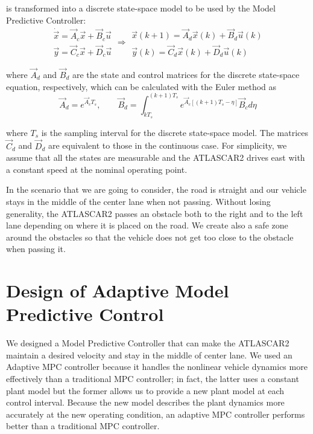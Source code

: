 is transformed into a discrete state-space model to be used by the Model Predictive Controller:
\begin{equation}
\label{eqn:dynamics_ss_obstacle_avoidance_dis}
\begin{array}{ll}
\dot{\vec{x}} =\vec{A}_c \vec{x}+ \vec{B}_c \vec{u}\\
\vec{y} =\vec{C}_c \vec{x} + \vec{D}_c \vec{u}
\end{array}
\Longrightarrow
\begin{array}{rr}
{\vec{x}}(k+1) =\vec{A}_d \vec{x}(k)+ \vec{B}_d \vec{u}(k)\\
\vec{y}(k) =\vec{C}_d \vec{x}(k) + \vec{D}_d \vec{u}(k)
\end{array}
\end{equation}

where $\vec{A}_d$ and $\vec{B}_d$ are the state and control matrices for the discrete state-space equation, respectively, which can be calculated with the Euler method as
\begin{equation}
\vec{A}_d = e^{\vec{A}_cT_s},\qquad \vec{B}_d = \int_{kT_s}^{(k+1)T_s} e^{\vec{A}_c[(k+1)T_s-\eta]}\vec{B}_c d\eta
\end{equation}

where $T_s$ is the sampling interval for the discrete state-space model. The matrices $\vec{C}_d$ and $\vec{D}_d$ are equivalent to those in the continuous case. For simplicity, we assume that all the states are measurable and the ATLASCAR2 drives east with a constant speed at the nominal operating point. 

In the scenario that we are going to consider, the road is straight and our vehicle stays in the middle of the center lane when not passing. Without losing generality, the ATLASCAR2 passes an obstacle both to the right and to the left lane depending on where it is placed on the road. We create also a safe zone around the obstacles so that the vehicle does not get too close to the obstacle when passing it.

\section{Design of Adaptive Model Predictive Control}
We designed a Model Predictive Controller that can make the ATLASCAR2 maintain a desired velocity and stay in the middle of center lane. We used an Adaptive MPC controller because it handles the nonlinear vehicle dynamics more effectively than a traditional MPC controller; in fact, the latter uses a constant plant model but the former allows us to provide a new plant model at each control interval. Because the new model describes the plant dynamics more accurately at the new operating condition, an adaptive MPC controller performs better than a traditional MPC controller. 

